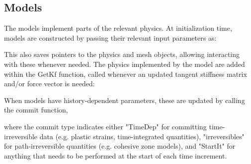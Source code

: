 \documentclass[3p]{elsarticle} %
\begin{document}
\subsection{Models}
\label{sec:models}
The models implement parts of the relevant physics. At initialization time, models are constructed by passing their relevant input parameters as:

This also saves pointers to the physics and mesh objects, allowing interacting with these whenever needed. The physics implemented by the model are added within the GetKf function, called whenever an updated tangent stiffness matrix and/or force vector is needed:

When models have history-dependent parameters, these are updated by calling the commit function, 

where the commit type indicates either "TimeDep" for committing time-irreversible data (e.g. plastic strains, time-integrated quantities), "irreversibles" for path-irreversible quantities (e.g. cohesive zone models), and "StartIt" for anything that needs to be performed at the start of each time increment.  
\end{document}
